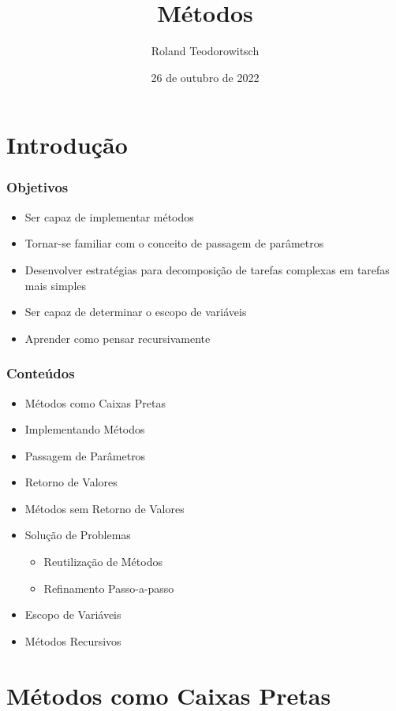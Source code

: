 \documentclass[xcolor={dvipsnames,table},aspectratio=169]{beamer}
\title[\sc{Métodos}]{Métodos}
\author[Roland Teodorowitsch]{Roland Teodorowitsch}
\institute[FPROG - EP - PUCRS]{Fundamentos de Programação - Escola Politécnica - PUCRS}
\date{26 de outubro de 2022}
\begin{document}
\justifying

\begin{frame}
	\titlepage
\end{frame}

\section{Introdução}

\begin{frame}\frametitle{Objetivos}
\begin{itemize}
	\item Ser capaz de implementar métodos
	\item Tornar-se familiar com o conceito de passagem de parâmetros
	\item Desenvolver estratégias para decomposição de tarefas complexas em tarefas mais simples
	\item Ser capaz de determinar o escopo de variáveis
	\item Aprender como pensar recursivamente
\end{itemize}
\end{frame}

\begin{frame}\frametitle{Conteúdos}
\begin{itemize}
	\item Métodos como Caixas Pretas
	\item Implementando Métodos
	\item Passagem de Parâmetros
	\item Retorno de Valores
	\item Métodos sem Retorno de Valores
	\item Solução de Problemas
	\begin{itemize}
		\item Reutilização de Métodos
		\item Refinamento Passo-a-passo
	\end{itemize}
	\item Escopo de Variáveis
	\item Métodos Recursivos
\end{itemize}
\end{frame}

\section{Métodos como Caixas Pretas}
\end{document}
